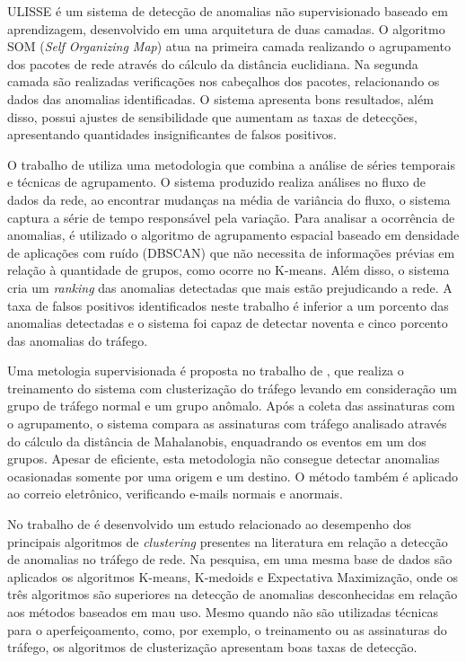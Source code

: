 \indent ULISSE \cite{Zanero2008} é um sistema de detecção de anomalias não supervisionado baseado em aprendizagem, desenvolvido em uma arquitetura de duas camadas. O algoritmo SOM (\textit{Self Organizing Map}) atua na primeira camada realizando o agrupamento dos pacotes de rede através do cálculo da distância euclidiana. Na segunda camada são realizadas verificações nos cabeçalhos dos pacotes, relacionando os dados das anomalias identificadas. O sistema apresenta bons resultados, além disso, possui ajustes de sensibilidade que aumentam as taxas de detecções, apresentando quantidades insignificantes de falsos positivos.

\indent O trabalho de  utiliza uma metodologia que combina a análise de séries temporais e técnicas de agrupamento. O sistema produzido realiza análises no fluxo de dados da rede, ao encontrar mudanças na média de variância do fluxo, o sistema captura a série de tempo responsável pela variação. Para analisar a ocorrência de anomalias, é utilizado o algoritmo de agrupamento espacial baseado em densidade de aplicações com ruído (DBSCAN) que não necessita de informações prévias em relação à quantidade de grupos, como ocorre no K-means. Além disso, o sistema cria um \textit{ranking} das anomalias detectadas que mais estão prejudicando a rede. A taxa de falsos positivos identificados neste trabalho é inferior a um porcento das anomalias detectadas e o sistema foi capaz de detectar noventa e cinco porcento das anomalias do tráfego.

\indent Uma metologia supervisionada é proposta no trabalho de , que realiza o treinamento do sistema com clusterização do tráfego levando em consideração um grupo de tráfego normal e um grupo anômalo. Após a coleta das assinaturas com o agrupamento, o sistema compara as assinaturas com tráfego analisado através do cálculo da distância de Mahalanobis, enquadrando os eventos em um dos grupos. Apesar de eficiente, esta metodologia não consegue detectar anomalias ocasionadas somente por uma origem e um destino. O método também é aplicado ao correio eletrônico, verificando e-mails normais e anormais.

\indent No trabalho de  é desenvolvido um estudo relacionado ao desempenho dos principais algoritmos de \textit{clustering} presentes na literatura em relação a detecção de anomalias no tráfego de rede. Na pesquisa, em uma mesma base de dados são aplicados os algoritmos K-means, K-medoids e Expectativa Maximização, onde os três algoritmos são superiores na detecção de anomalias desconhecidas em relação aos métodos baseados em mau uso. Mesmo quando não são utilizadas técnicas para o aperfeiçoamento, como, por exemplo, o treinamento ou as assinaturas do tráfego, os algoritmos de clusterização apresentam boas taxas de detecção.


